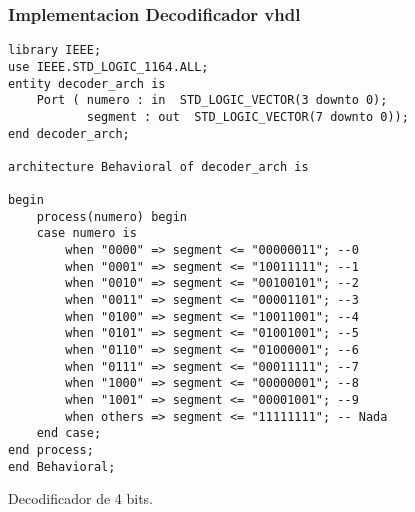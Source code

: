 \documentclass[a4paper]{article}
\begin{document}
\subsubsection{Implementacion Decodificador vhdl}
\begin{listing}[H]
	\begin{verbatim}
library IEEE;
use IEEE.STD_LOGIC_1164.ALL;
entity decoder_arch is
    Port ( numero : in  STD_LOGIC_VECTOR(3 downto 0);
           segment : out  STD_LOGIC_VECTOR(7 downto 0));
end decoder_arch;

architecture Behavioral of decoder_arch is

begin
	process(numero) begin
	case numero is
		when "0000" => segment <= "00000011"; --0
		when "0001" => segment <= "10011111"; --1
		when "0010" => segment <= "00100101"; --2
		when "0011" => segment <= "00001101"; --3
		when "0100" => segment <= "10011001"; --4
		when "0101" => segment <= "01001001"; --5
		when "0110" => segment <= "01000001"; --6
		when "0111" => segment <= "00011111"; --7
		when "1000" => segment <= "00000001"; --8
		when "1001" => segment <= "00001001"; --9
		when others => segment <= "11111111"; -- Nada
	end case;
end process;
end Behavioral;
\end{verbatim}
\caption{Decodificador de 4 bits.}
    \label{decodificador}
\end{listing}
\end{document}
